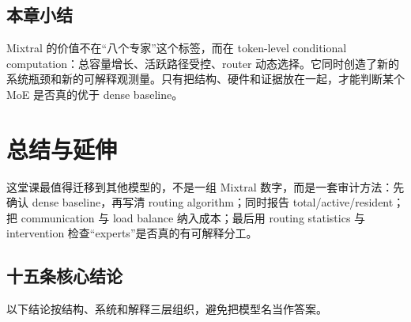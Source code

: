 \documentclass[a4paper]{article}
\begin{document}

\subsection{本章小结}

Mixtral 的价值不在“八个专家”这个标签，而在 token-level conditional computation：总容量增长、活跃路径受控、router 动态选择。它同时创造了新的系统瓶颈和新的可解释观测量。只有把结构、硬件和证据放在一起，才能判断某个 MoE 是否真的优于 dense baseline。

\section{总结与延伸}

这堂课最值得迁移到其他模型的，不是一组 Mixtral 数字，而是一套审计方法：先确认 dense baseline，再写清 routing algorithm；同时报告 total/active/resident；把 communication 与 load balance 纳入成本；最后用 routing statistics 与 intervention 检查“experts”是否真的有可解释分工。

\subsection{十五条核心结论}

以下结论按结构、系统和解释三层组织，避免把模型名当作答案。
\end{document}
